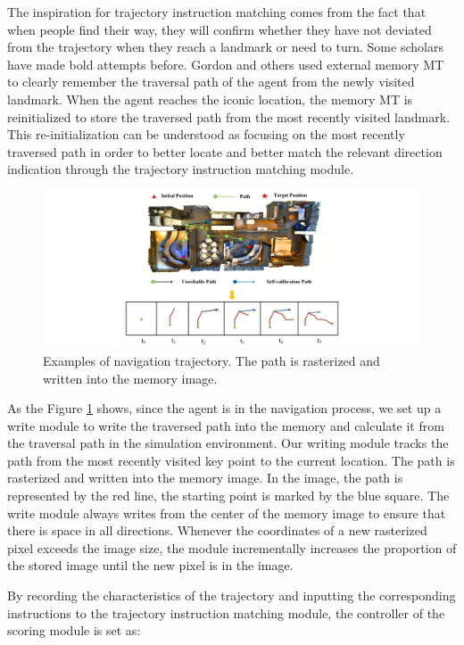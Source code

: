 The inspiration for trajectory instruction matching comes from the fact that when people find their way, they will confirm whether they have not deviated from the trajectory when they reach a landmark or need to turn. Some scholars have made bold attempts before. Gordon and others used external memory MT to clearly remember the traversal path of the agent from the newly visited landmark\cite{vasudevan2021talk2nav}. When the agent reaches the iconic location, the memory MT is reinitialized to store the traversed path from the most recently visited landmark. This re-initialization can be understood as focusing on the most recently traversed path in order to better locate and better match the relevant direction indication through the trajectory instruction matching module.

\begin{figure}[h]
	\centering
	\includegraphics[scale=1]{image06.png}
	\caption{Examples of navigation trajectory. The path is rasterized and written into the memory image.}
	\label{image06}
\end{figure}

As the Figure \ref{image06} shows, since the agent is in the navigation process, we set up a write module to write the traversed path into the memory and calculate it from the traversal path in the simulation environment. Our writing module tracks the path from the most recently visited key point to the current location. The path is rasterized and written into the memory image. In the image, the path is represented by the red line, the starting point is marked by the blue square. The write module always writes from the center of the memory image to ensure that there is space in all directions. Whenever the coordinates of a new rasterized pixel exceeds the image size, the module incrementally increases the proportion of the stored image until the new pixel is in the image.

By recording the characteristics of the trajectory and inputting the corresponding instructions to the trajectory instruction matching module, the controller of the scoring module is set as:


